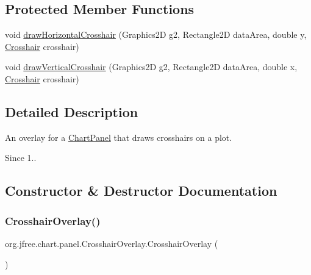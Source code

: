 \subsection*{Protected Member Functions}
\begin{DoxyCompactItemize}
\item 
void \mbox{\hyperlink{classorg_1_1jfree_1_1chart_1_1panel_1_1_crosshair_overlay_af380a18bde073963bd8e04e8bafa9d1d}{draw\+Horizontal\+Crosshair}} (Graphics2D g2, Rectangle2D data\+Area, double y, \mbox{\hyperlink{classorg_1_1jfree_1_1chart_1_1plot_1_1_crosshair}{Crosshair}} crosshair)
\item 
void \mbox{\hyperlink{classorg_1_1jfree_1_1chart_1_1panel_1_1_crosshair_overlay_a76c62aba9bce8f33072f96fb6e74438c}{draw\+Vertical\+Crosshair}} (Graphics2D g2, Rectangle2D data\+Area, double x, \mbox{\hyperlink{classorg_1_1jfree_1_1chart_1_1plot_1_1_crosshair}{Crosshair}} crosshair)
\end{DoxyCompactItemize}


\subsection{Detailed Description}
An overlay for a \mbox{\hyperlink{classorg_1_1jfree_1_1chart_1_1_chart_panel}{Chart\+Panel}} that draws crosshairs on a plot.

\begin{DoxySince}{Since}
1.. 
\end{DoxySince}


\subsection{Constructor \& Destructor Documentation}
\mbox{\label{classorg_1_1jfree_1_1chart_1_1panel_1_1_crosshair_overlay_a80fa1f2b410c542e53c435b70aefbb9c}} 
\subsubsection{\texorpdfstring{Crosshair\+Overlay()}{CrosshairOverlay()}}
{\footnotesize\ttfamily org.\+jfree.\+chart.\+panel.\+Crosshair\+Overlay.\+Crosshair\+Overlay (\begin{DoxyParamCaption}{ }\end{DoxyParamCaption})}

